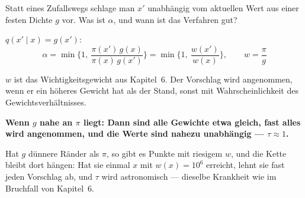 \begin{aufgabe}
Statt eines Zufallswegs schlage man $x'$ unabhängig vom aktuellen Wert aus einer festen Dichte $g$ vor. Was ist $\alpha$, und wann ist das Verfahren gut?

\loesung
{}
$q(x'\mid x) = g(x')$:
\[ \alpha = \min\Big\{1,\ \frac{\pi(x')\,g(x)}{\pi(x)\,g(x')}\Big\} = \min\Big\{1,\ \frac{w(x')}{w(x)}\Big\}, \qquad w = \frac{\pi}{g} \]

$w$ ist das Wichtigkeitsgewicht aus Kapitel~6. Der Vorschlag wird angenommen, wenn er ein höheres Gewicht hat als der Stand, sonst mit Wahrscheinlichkeit des Gewichtsverhältnisses.

\begin{center}
\begin{minipage}{0.9\textwidth}
\textbf{Wenn $g$ nahe an $\pi$ liegt: Dann sind alle Gewichte etwa gleich, fast alles wird angenommen, und die Werte sind nahezu unabhängig --- $\tau \approx 1$.}
\end{minipage}
\end{center}
Hat $g$ dünnere Ränder als $\pi$, so gibt es Punkte mit riesigem $w$, und die Kette bleibt dort hängen: Hat sie einmal $x$ mit $w(x) = 10^{6}$ erreicht, lehnt sie fast jeden Vorschlag ab, und $\tau$ wird astronomisch --- dieselbe Krankheit wie im Bruchfall von Kapitel~6.

\begin{center}
\begin{minipage}{0.88\textwidth}
\end{minipage}
\end{center}
\end{aufgabe}

